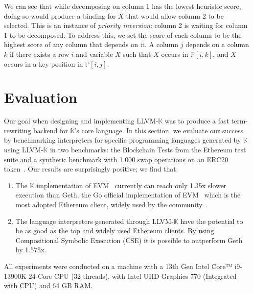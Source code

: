 \documentclass{article}
\theoremstyle{definition}
\newcommand{\K}{$\mathbb{K}$\xspace}
\newcommand{\KL}{LLVM-\K}
\newcommand{\PP}{\mathbb{P}}
\begin{document}
We can see that while decomposing on column 1 has the lowest heuristic score,
doing so would produce a binding for $ X $ that would allow column 2 to be
selected. This is an instance of \emph{priority inversion}: column 2 is waiting
for column 1 to be decomposed. To address this, we set the score of each column
to be the highest score of any column that depends on it. A column $ j $ depends
on a column $ k $ if there exists a row $ i $ and variable $ X $ such that $ X $
occurs in $ \PP[i, k] $, and $ X $ occurs in a key position in $ \PP[i, j] $.














\section{Evaluation} \label{sec:eval}
Our goal when designing and implementing \KL was to produce a fast
term-rewriting backend for \K's core language. In this section, we evaluate our
success by benchmarking interpreters for specific programming languages generated by \K using \KL in two benchmarks: the Blockchain Tests from the Ethereum test suite \cite{ethereum-tests} and a synthetic benchmark with 1,000 swap operations on an ERC20 token~\cite{1kswapscode}. Our results are surprisingly positive; we find that:

\begin{enumerate}
    \item The \K implementation of EVM~\cite{HSZ+18} currently can reach only 1.35x slower execution than Geth, the Go official implementation of EVM~\cite{geth} which is the most adopted Ethereum client, widely used by the community~\cite{ethernodes}.
    \item The language interpreters generated through \KL have the potential to be as good as the top and widely used Ethereum clients. By using Compositional Symbolic Execution (CSE) it is possible to outperform Geth by 1.575x.
\end{enumerate}




All experiments were conducted on a machine with a 13th Gen Intel\textsuperscript{\tiny\textregistered} Core™ i9-13900K 24-Core CPU (32 threads), with Intel\textsuperscript{\tiny\textregistered} UHD Graphics 770 (Integrated with CPU) and 64 GB RAM.
\end{document}
